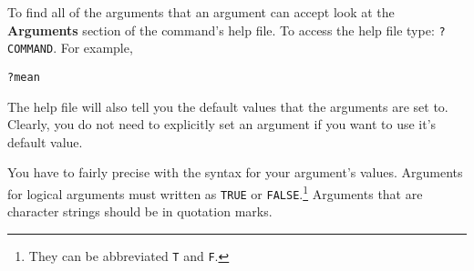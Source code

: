 To find all of the arguments that an argument can accept look at the {\bf{Arguments}} section of the command's help file. To access the help file type: \texttt{?COMMAND}. For example,

\begin{knitrout}
\color{fgcolor}\begin{kframe}
\begin{alltt}
?mean
\end{alltt}
\end{kframe}
\end{knitrout}


\noindent The help file will also tell you the default values that the arguments are set to. Clearly, you do not need to explicitly set an argument if you want to use it's default value.

You have to fairly precise with the syntax for your argument's values. Arguments for logical arguments must written as \texttt{TRUE} or \texttt{FALSE}.\footnote{They can be abbreviated \texttt{T} and \texttt{F}.} Arguments that are character strings should be in quotation marks.

